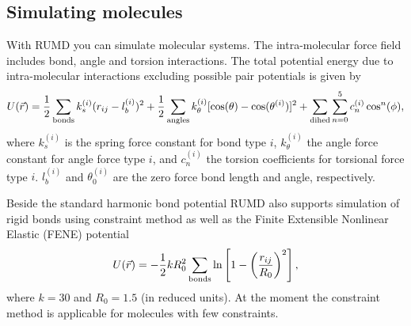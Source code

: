 \subsection{Simulating molecules}
With RUMD you can simulate molecular systems. The intra-molecular 
force field includes bond, angle and torsion interactions. The total
potential energy due to intra-molecular interactions excluding
possible pair potentials is given by 
\begin{eqnarray}
\label{eq:intrapot}
U(\vec{r}) = \frac{1}{2}\sum_{\mbox{\scriptsize{bonds}}}k_s^{(i)} (r_{ij}-l_b^{(i)})^2 + 
\frac{1}{2}\sum_{\mbox{\scriptsize{angles}}}k_\theta^{(i)} [\cos(\theta)-\cos(\theta^{(i)})]^2 + 
\sum_{\mbox{\scriptsize{dihed}}} \sum_{n=0}^5 c_n^{(i)} \cos^n(\phi), 
\end{eqnarray}
where $k_s^{(i)}$ is the spring force constant for bond type $i$, $k_\theta^{(i)}$ the 
angle force constant for angle force type $i$, and $c_n^{(i)}$ the torsion 
coefficients for torsional force type $i$. $l_b^{(i)}$ and
$\theta_0^{(i)}$ are the zero force bond length and angle,
respectively. 

Beside the standard harmonic bond potential RUMD also supports
simulation of rigid bonds using constraint method as well as the  
Finite Extensible Nonlinear Elastic (FENE) potential 
\begin{eqnarray}
U(\vec{r}) = -\frac{1}{2}kR_0^2\sum_{\mbox{\scriptsize{bonds}}} \ln\left[ 1 -\left(\frac{r_{ij}}{R_0}\right)^2\right],
\end{eqnarray}
where $k=30$ and $R_0=1.5$ (in reduced units). At the moment 
the constraint method is applicable for molecules with few
constraints.  


